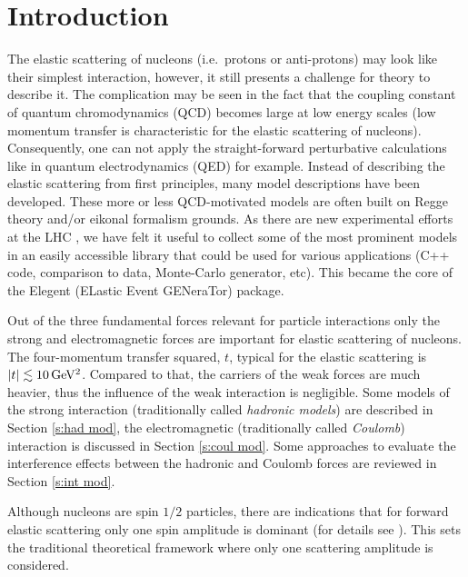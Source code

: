\documentclass[preprint,12pt]{elsarticle}
\def\un#1{{\,\rm #1}}
\begin{document}
\fi

\newpage



\section{Introduction}\label{s:inc}

The elastic scattering of nucleons (i.e.~protons or anti-protons) may look like their simplest interaction, however, it still presents a challenge for theory to describe it. The complication may be seen in the fact that the coupling constant of quantum chromodynamics (QCD) becomes large at low energy scales (low momentum transfer is characteristic for the elastic scattering of nucleons). Consequently, one can not apply the straight-forward perturbative calculations like in quantum electrodynamics (QED) for example. Instead of describing the elastic scattering from first principles, many model descriptions have been developed. These more or less QCD-motivated models are often built on Regge theory and/or eikonal formalism grounds. As there are new experimental efforts at the LHC \cite{totem,alfa}, we have felt it useful to collect some of the most prominent models in an easily accessible library that could be used for various applications (C++ code, comparison to data, Monte-Carlo generator, etc). This became the core of the Elegent (ELastic Event GENeraTor) package.

Out of the three fundamental forces relevant for particle interactions only the strong and electromagnetic forces are important for elastic scattering of nucleons. The four-momentum transfer squared, $t$, typical for the elastic scattering is $|t| \lesssim 10\un{GeV^2}$. Compared to that, the carriers of the weak forces are much heavier, thus the influence of the weak interaction is negligible. Some models of the strong interaction (traditionally called {\em hadronic models}) are described in Section \ref{s:had mod}, the electromagnetic (traditionally called {\em Coulomb}) interaction is discussed in Section \ref{s:coul mod}. Some approaches to evaluate the interference effects between the hadronic and Coulomb forces are reviewed in Section \ref{s:int mod}.

Although nucleons are spin $1/2$ particles, there are indications that for forward elastic scattering only one spin amplitude is dominant (for details see \cite[section 1]{jan_thesis}). This sets the traditional theoretical framework where only one scattering amplitude is considered.
\end{document}
